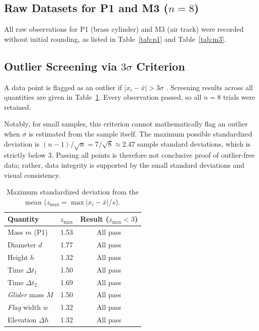 \documentclass[a4paper, 12pt]{article}
\begin{document}
\subsection{Raw Datasets for P1 and M3 (\texorpdfstring{$n=8$}{n=8})}
        All raw observations for P1 (brass cylinder) and M3 (air track) were recorded without initial rounding, as listed in Table~\ref{tab:p1} and Table~\ref{tab:m3}.

        \subsection{Outlier Screening via \texorpdfstring{$3\sigma$}{3 sigma} Criterion}
        A data point is flagged as an outlier if $|x_i-\bar{x}|>3\sigma$ \parencite{Taylor1997}. Screening results across all quantities are given in Table~\ref{tab:z}. Every observation passed, so all $n=8$ trials were retained.

        Notably, for small samples, this criterion cannot mathematically flag an outlier when $\sigma$ is estimated from the sample itself. The maximum possible standardized deviation is $(n-1)/\sqrt{n}=7/\sqrt{8}\approx 2.47$ sample standard deviations, which is strictly below $3$. Passing all points is therefore not conclusive proof of outlier-free data; rather, data integrity is supported by the small standard deviations and visual consistency.


\begin{table}[H]
\centering
\singlespacing
\caption{Maximum standardized deviation from the mean ($z_{\max}=\max|x_i-\bar{x}|/s$).}
\label{tab:z}
\small
\begin{tabular}{l c c}
\toprule
\textbf{Quantity} & $z_{\max}$ & \textbf{Result ($z_{\max}<3$)}\\
\midrule
Mass $m$ (P1) & 1.53 & All pass\\
Diameter $d$ & 1.77 & All pass\\
Height $h$ & 1.32 & All pass\\
Time $\Delta t_1$ & 1.50 & All pass\\
Time $\Delta t_2$ & 1.69 & All pass\\
\textit{Glider} mass $M$ & 1.50 & All pass\\
\textit{Flag} width $w$ & 1.32 & All pass\\
Elevation $\Delta h$ & 1.32 & All pass\\
\bottomrule
\end{tabular}
\end{table}
\end{document}
